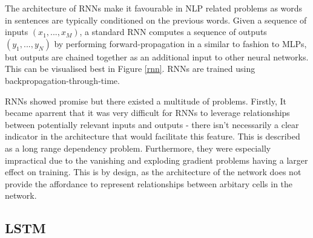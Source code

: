 \documentclass[12pt,twoside]{report}
\begin{document}
The architecture of RNNs make it favourable in NLP related problems as words in sentences are typically conditioned on the previous words. Given a sequence of inputs $(x_1, ..., x_M)$, a standard RNN computes a sequence of outputs $(y_1, ..., y_N)$ by performing forward-propagation in a similar to fashion to MLPs, but outputs are chained together as an additional input to other neural networks. This can be visualised best in Figure \ref{rnn}. RNNs are trained using backpropagation-through-time.


RNNs showed promise but there existed a multitude of problems. Firstly, It became aparrent that it was very difficult for RNNs to leverage relationships between potentially relevant inputs and outputs - there isn't necessarily a clear indicator in the architecture that would facilitate this feature. This is described as a long range dependency problem. Furthermore, they were especially impractical due to the vanishing and exploding gradient problems having a larger effect on training. This is by design, as the architecture of the network does not provide the affordance to represent relationships between arbitary cells in the network.

\subsection{LSTM}
\end{document}
